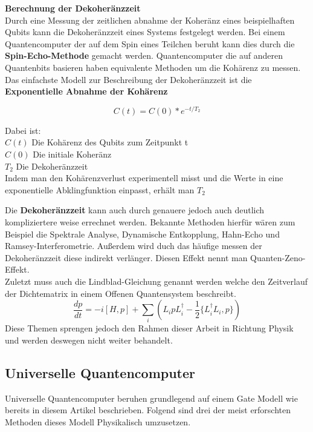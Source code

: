 \textbf{Berechnung der Dekoheränzzeit}\\
Durch eine Messung der zeitlichen abnahme der Koheränz eines beispielhaften Qubits kann die Dekoheränzzeit eines Systems festgelegt werden.
Bei einem Quantencomputer der auf dem Spin eines Teilchen beruht kann dies durch die \textbf{Spin-Echo-Methode} gemacht werden.
Quantencomputer die auf anderen Quantenbits basieren haben equivalente Methoden um die Kohärenz zu messen.\\

Das einfachste Modell zur Beschreibung der Dekoheränzzeit ist die \textbf{Exponentielle Abnahme der Kohärenz}

\begin{equation}
    C(t) = C(0)*e^{-t/T_2}
\end{equation}

Dabei ist:\\
$C(t)$ Die Kohärenz des Qubits zum Zeitpunkt t\\
$C(0)$ Die initiale Koheränz\\
$T_2$ Die Dekoheränzzeit\\

Indem man den Kohärenzverlust experimentell misst und die Werte in eine exponentielle Abklingfunktion einpasst, erhält man $T_2$\\

\begin{tcolorbox}[title=Kommentar,
    title filled=false,
    colback=cyan!5!white,
    colframe=cyan!75!black]
    Die \textbf{Dekoheränzzeit} kann auch durch genauere jedoch auch deutlich kompliziertere weise errechnet werden.
    Bekannte Methoden hierfür wären zum Beispiel die Spektrale Analyse, Dynamische Entkopplung, Hahn-Echo und Ramsey-Interferometrie.
    Außerdem wird duch das häufige messen der Dekoheränzzeit diese indirekt verlänger. Diesen Effekt nennt man Quanten-Zeno-Effekt.\\
    Zuletzt muss auch die Lindblad-Gleichung genannt werden welche den Zeitverlauf der Dichtematrix in einem Offenen Quantensystem beschreibt.
    \begin{equation}
        \frac{dp}{dt} = -i[H,p]+\sum_i(L_ipL^\dagger_i-\frac{1}{2}\{L^\dagger_i L_i,p\})
    \end{equation}
    Diese Themen sprengen jedoch den Rahmen dieser Arbeit in Richtung Physik und werden deswegen nicht weiter behandelt.
\end{tcolorbox}

\subsection{Universelle Quantencomputer}
\label{sub:universelle_quantencomputer}
Universelle Quantencomputer beruhen grundlegend auf einem Gate Modell wie bereits in diesem Artikel beschrieben. Folgend sind drei der meist erforschten
Methoden dieses Modell Physikalisch umzusetzen.

